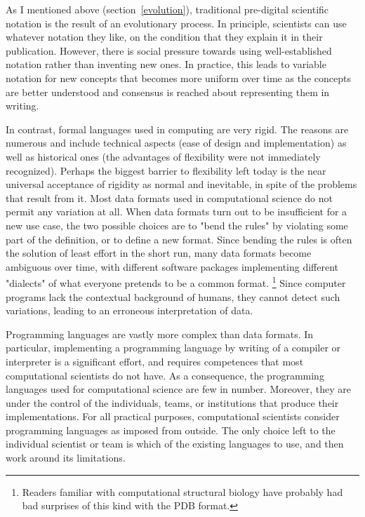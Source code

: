 As I mentioned above (section~\ref{evolution}), traditional pre-digital scientific notation is the result of an evolutionary process. In principle, scientists can use whatever notation they like, on the condition that they explain it in their publication. However, there is social pressure towards using well-established notation rather than inventing new ones. In practice, this leads to variable notation for new concepts that becomes more uniform over time as the concepts are better understood and consensus is reached about representing them in writing.

In contrast, formal languages used in computing are very rigid. The reasons are numerous and include technical aspects (ease of design and implementation) as well as historical ones (the advantages of flexibility were not immediately recognized). Perhaps the biggest barrier to flexibility left today is the near universal acceptance of rigidity as normal and inevitable, in spite of the problems that result from it. Most data formats used in computational science do not permit any variation at all. When data formats turn out to be insufficient for a new use case, the two possible choices are to "bend the rules" by violating some part of the definition, or to define a new format. Since bending the rules is often the solution of least effort in the short run, many data formats become ambiguous over time, with different software packages implementing different "dialects" of what everyone pretends to be a common format. \footnote{Readers familiar with computational structural biology have probably had bad surprises of this kind with the PDB \cite{wwpdb_atomic_2011} format.} Since computer programs lack the contextual background of humans, they cannot detect such variations, leading to an erroneous interpretation of data.

Programming languages are vastly more complex than data formats. In particular, implementing a programming language by writing of a compiler or interpreter is a significant effort, and requires competences that most computational scientists do not have. As a consequence, the programming languages used for computational science are few in number. Moreover, they are under the control of the individuals, teams, or institutions that produce their implementations. For all practical purposes, computational scientists consider programming languages as imposed from outside. The only choice left to the individual scientist or team is which of the existing languages to use, and then work around its limitations.

